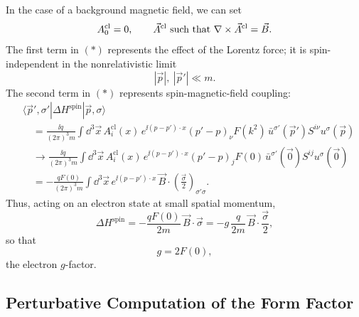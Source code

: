 In the case of a background magnetic field, we can set
\[
  A_0^{\mathrm{cl}}=0,
  \qquad
  \vec A^{\mathrm{cl}}\hbox{ such that }\nabla\times\vec A^{\mathrm{cl}}=\vec B.
\]
The first term in \((\ast)\) represents the effect of the Lorentz force; it
is spin-independent in the nonrelativistic limit
\[
  |\vec p|,\ |\vec p'|\ll m.
\]
The second term in \((\ast)\) represents spin-magnetic-field coupling:
\[
\begin{aligned}
  &\langle \vec p',\sigma'|\Delta H^{\mathrm{spin}}|\vec p,\sigma\rangle
\\
  &\quad =
  \frac{\ii q}{(2\pi)^3m}
  \int\dd^3\vec x\,A_i^{\mathrm{cl}}(x)\,
  e^{\ii(p-p')\cdot x}(p'-p)_\nu F(k^2)\,
  \bar u^{\sigma'}(\vec p')S^{i\nu}u^\sigma(\vec p)
\\
  &\quad \longrightarrow
  \frac{\ii q}{(2\pi)^3m}
  \int\dd^3\vec x\,A_i^{\mathrm{cl}}(x)\,
  e^{\ii(p-p')\cdot x}(p'-p)_jF(0)\,
  \bar u^{\sigma'}(\vec 0)S^{ij}u^\sigma(\vec 0)
\\
  &\quad =
  -\frac{qF(0)}{(2\pi)^3m}
  \int\dd^3\vec x\,e^{\ii(p-p')\cdot x}\,
  \vec B\cdot\left(\frac{\vec\sigma}{2}\right)_{\sigma'\sigma}.
\end{aligned}
\]
Thus, acting on an electron state at small spatial momentum,
\[
  \Delta H^{\mathrm{spin}}
  =
  -\frac{qF(0)}{2m}\,\vec B\cdot\vec\sigma
  =
  -g\,\frac{q}{2m}\,\vec B\cdot\frac{\vec\sigma}{2},
\]
so that
\[
  g=2F(0),
\]
the electron \(g\)-factor.

\subsection{Perturbative Computation of the Form Factor}

